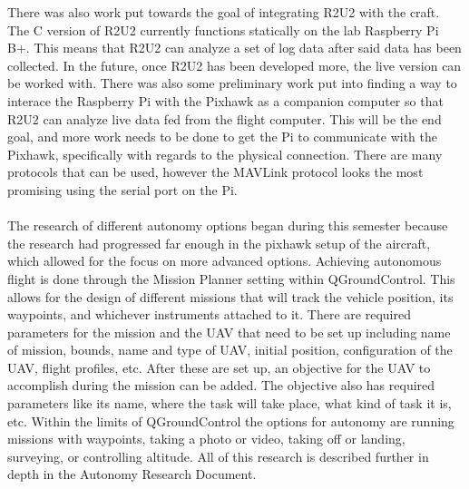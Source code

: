 \documentclass{article}
\begin{document}
There was also work put towards the goal of integrating R2U2 with the craft. The C version of R2U2 currently functions statically on the lab Raspberry Pi B+. This means that R2U2 can analyze a set of log data after said data has been collected. In the future, once R2U2 has been developed more, the live version can be worked with. There was also some preliminary work put into finding a way to interace the Raspberry Pi with the Pixhawk as a companion computer so that R2U2 can analyze live data fed from the flight computer. This will be the end goal, and more work needs to be done to get the Pi to communicate with the Pixhawk, specifically with regards to the physical connection. There are many protocols that can be used, however the MAVLink protocol looks the most promising using the serial port on the Pi. \\ \\

The research of different autonomy options began during this semester because the research had progressed far enough in the pixhawk setup of the aircraft, which allowed for the focus on more advanced options. Achieving autonomous flight is done through the Mission Planner setting within QGroundControl. This allows for the design of different missions that will track the vehicle position, its waypoints, and whichever instruments attached to it. There are required parameters for the mission and the UAV that need to be set up including name of mission, bounds, name and type of UAV, initial position, configuration of the UAV, flight profiles, etc. After these are set up, an objective for the UAV to accomplish during the mission can be added. The objective also has required parameters like its name, where the task will take place, what kind of task it is, etc. Within the limits of QGroundControl the options for autonomy are running missions with waypoints, taking a photo or video, taking off or landing, surveying, or controlling altitude. All of this research is described further in depth in the Autonomy Research Document. \\ \\
\end{document}
